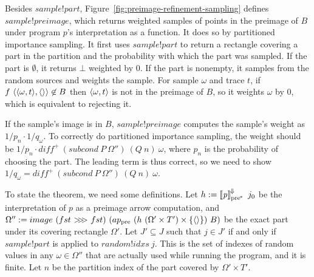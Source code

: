 Besides $sample!part$, Figure~\ref{fig:preimage-refinement-sampling} defines $sample!preimage$, which returns weighted samples of points in the preimage of $B$ under program $\mathit{p}$'s interpretation as a function.
It does so by partitioned importance sampling.
It first uses $sample!part$ to return a rectangle covering a part in the partition and the probability with which the part was sampled.
If the part is $\emptyset$, it returns $\bot$ weighted by $0$.
If the part is nonempty, it samples from the random sources and weights the sample.
For sample $\omega$ and trace $t$, if $f~\langle{\langle{\omega,t}\rangle,\langle{}\rangle}\rangle \not\in B$ then $\langle{\omega,t}\rangle$ is not in the preimage of $B$, so it weights $\omega$ by $0$, which is equivalent to rejecting it.

If the sample's image is in $B$, $sample!preimage$ computes the sample's weight as $1{/}p_n \cdot 1{/}q_\omega$.
To correctly do partitioned importance sampling, the weight should be $1{/}p_n \cdot diff^+~(subcond~P~\Omega'')~(Q~n)~\omega$, where $p_n$ is the probability of choosing the part.
The leading term is thus correct, so we need to show $1{/}q_\omega = diff^+~(subcond~P~\Omega'')~(Q~n)~\omega$.

To state the theorem, we need some definitions.
Let $h := \left\llbracket{\mathit{p}}\right\rrbracket^{\mspace{-2mu}\Downarrow\mspace{-2mu}}_\mathrm{pre^{\mspace{-2mu}*}}~j_0$ be the interpretation of $\mathit{p}$ as a preimage arrow computation, and $\Omega'' := image~(fst~{>}\mspace{-6mu}{>}\mspace{-6mu}{>}~fst)~(ap_\mathrm{pre}~(h~(\Omega' \times T') \times \{{\langle{}\rangle}\})~B)$ be the exact part under its covering rectangle $\Omega'$.
Let $J' \subseteq J$ such that $j \in J'$ if and only if $sample!part$ is applied to $random!idxs~j$.
This is the set of indexes of random values in any $\omega \in \Omega''$ that are actually used while running the program, and it is finite.
Let $n$ be the partition index of the part covered by $\Omega' \times T'$.


